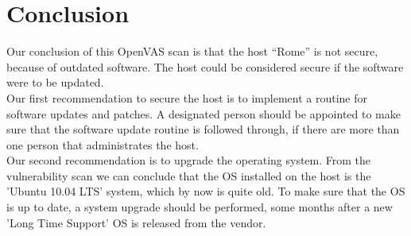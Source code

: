 \section{Conclusion} \label{sec:conclusion}

Our conclusion of this OpenVAS scan is that the host “Rome” is not secure, because of outdated software. The host could be considered secure if the software were to be updated. \\

\noindent Our first recommendation to secure the host is to implement a routine for software updates and patches. A designated person should be appointed to make sure that the software update routine is followed through, if there are more than one person that administrates the host. \\

\noindent Our second recommendation is to upgrade the operating system. From the vulnerability scan we can conclude that the OS installed on the host is the 'Ubuntu 10.04 LTS' system, which by now is quite old. To make sure that the OS is up to date, a system upgrade should be performed, some months after a new 'Long Time Support' OS is released from the vendor. 
